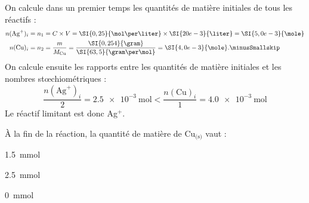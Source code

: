 \reponse{\reponseA}

\begin{corrige}
On calcule dans un premier temps les quantités de matière initiales de tous les réactifs : \minusSmallskip
\begin{align*}
 n(\text{Ag}^+)_i&=n_1=C\times V=\SI{0,25}{\mol\per\liter} \times \SI{20e-3}{\liter}=\SI{5,0e-3}{\mole}\\
 n(\text{Cu})_i&=n_2=\frac{m}{M_{\text{Cu}}}=\frac{\SI{0,254}{\gram}}{\SI{63,5}{\gram\per\mol}}=\SI{4,0e-3}{\mole}.\minusSmallskip
\end{align*}
On calcule ensuite les rapports entre les quantités de matière initiales et les nombres stœchiométriques : 
\[
\frac{ n(\text{Ag}^+)_i}{2}=\SI{2,5e-3}{\mole} <\frac{n(\text{Cu})_i}{1}=\SI{4,0e-3}{\mole}
\]
Le réactif limitant est donc Ag$^+$.
\end{corrige}



\begin{enonce}
À la fin de la réaction, la quantité de matière de $\mathrm{Cu}_\text{(s)}$ vaut :
	\begin{listeQCM3Colonnes}%
	\item \SI{1.5}{\milli\mol}
	\item \SI{2.5}{\milli\mol}
	\item \SI{0}{\milli\mol}
	\end{listeQCM3Colonnes}		
\end{enonce}

\reponse{\reponseA{}}

